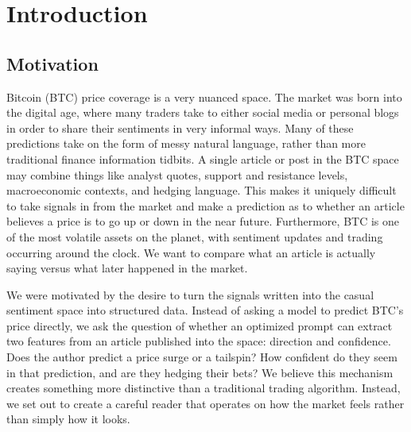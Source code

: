 \documentclass[sigconf,screen]{acmart}
\begin{document}


\begin{teaserfigure}
    \centering
    \makebox[\textwidth][c]{}
    \caption{Overview of the Bitcoin news prompt optimization study.}
    \label{fig:teaser}
\end{teaserfigure}

\maketitle

\section{Introduction}

\subsection{Motivation}
Bitcoin (BTC) price coverage is a very nuanced space. The market was born into the digital age, where many traders take to either social media or personal blogs in order to share their sentiments in very informal ways. Many of these predictions take on the form of messy natural language, rather than more traditional finance information tidbits. A single article or post in the BTC space may combine things like analyst quotes, support and resistance levels, macroeconomic contexts, and hedging language. This makes it uniquely difficult to take signals in from the market and make a prediction as to whether an article believes a price is to go up or down in the near future. Furthermore, BTC is one of the most volatile assets on the planet, with sentiment updates and trading occurring around the clock. We want to compare what an article is actually saying versus what later happened in the market.

We were motivated by the desire to turn the signals written into the casual sentiment space into structured data. Instead of asking a model to predict BTC’s price directly, we ask the question of whether an optimized prompt can extract two features from an article published into the space: direction and confidence. Does the author predict a price surge or a tailspin? How confident do they seem in that prediction, and are they hedging their bets? We believe this mechanism creates something more distinctive than a traditional trading algorithm. Instead, we set out to create a careful reader that operates on how the market feels rather than simply how it looks.
\end{document}
